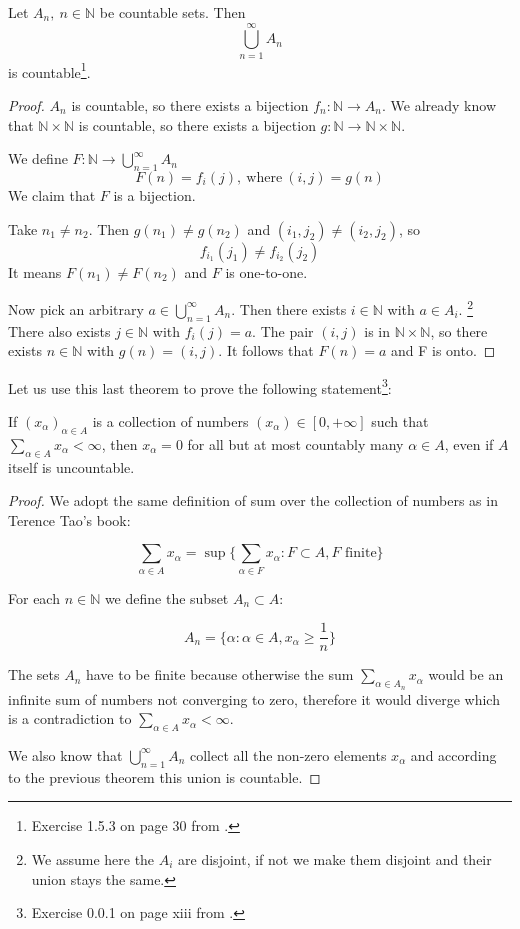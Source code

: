 \begin{thm}
Let $A_n, ~n \in \mathbb{N}$ be countable sets. Then 
$$
\bigcup_{n=1}^\infty A_n
$$ 
is countable\footnote{Exercise 1.5.3 on page 30 from .}.
\end{thm}

\begin{proof}
$A_n$ is countable, so there exists a bijection $f_n:\mathbb{N} \rightarrow A_n$. We already know that $\mathbb{N} \times \mathbb{N}$ is countable, so there exists a bijection $g:\mathbb{N} \rightarrow \mathbb{N} \times \mathbb{N}$.

We define $F:\mathbb{N} \rightarrow \bigcup_{n=1}^\infty A_n$
$$
F(n) = f_i(j), ~\text{where}~ (i, j) = g(n)
$$
We claim that $F$ is a bijection.

Take $n_1 \ne n_2$. Then $g(n_1) \ne g(n_2)$ and $(i_1, j_2) \ne (i_2, j_2)$, so 
$$
f_{i_1}(j_1) \ne f_{i_2}(j_2)
$$
It means $F(n_1) \ne F(n_2)$ and $F$ is one-to-one.

Now pick an arbitrary $a \in \bigcup_{n=1}^\infty A_n$. Then there exists $i \in \mathbb{N}$ with $a \in A_i$. \footnote{We assume here the $A_i$ are disjoint, if not we make them disjoint and their union stays the same.} There also exists $j \in \mathbb{N}$ with $f_i(j) = a$. The pair $(i, j)$ is in
$\mathbb{N} \times \mathbb{N}$, so there exists $n \in \mathbb{N}$ with $g(n)=(i, j)$. It follows that $F(n)=a$ and F is onto. 
\end{proof}

Let us use this last theorem to prove the following statement\footnote{Exercise 0.0.1 on page xiii from .}:

\begin{thm}
If $(x_\alpha)_{\alpha \in A}$ is a collection of numbers $(x_\alpha) \in [0, +\infty]$ such that $\sum_{\alpha \in A} x_\alpha < \infty$, then $x_\alpha = 0$ for all but at most countably many $\alpha \in A$, even if $A$ itself is uncountable.
\end{thm}

\begin{proof}

We adopt the same definition of sum over the collection of numbers as in Terence Tao's book:

$$
\sum_{\alpha \in A} x_\alpha = \sup\{\sum_{\alpha \in F} x_\alpha: F \subset A, F \text{ finite}\}
$$

For each $n \in \mathbb{N}$ we define the subset $A_n \subset A$:

$$
A_n = \{\alpha: \alpha \in A, x_\alpha \geq \frac{1}{n}\}
$$

The sets $A_n$ have to be finite because otherwise the sum $\sum_{\alpha \in A_n} x_\alpha$ would be an infinite sum of numbers not converging to zero, therefore it would diverge which is a contradiction to $\sum_{\alpha \in A} x_\alpha < \infty$.

We also know that $\bigcup_{n=1}^\infty A_n$ collect all the non-zero elements $x_\alpha$ and according to the previous theorem this union is countable. 
\end{proof}